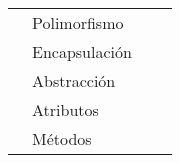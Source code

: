 \begin{table}[]
\begin{tabular}{|llll|}
                                                                            & Polimorfismo  &                                                                                                                                                                                                       &                                                                                                                                                                                                                                                             \\
                                                                            & Encapsulación &                                                                                                                                                                                                       &                                                                                                                                                                                                                                                             \\
                                                                            & Abstracción   &                                                                                                                                                                                                       &                                                                                                                                                                                                                                                             \\
                                                                            & Atributos     &                                                                                                                                                                                                       &                                                                                                                                                                                                                                                             \\
                                                                            & Métodos       &                                                                                                                                                                                                       &                                                                                                                                                                                                                                                             \\

\end{tabular}
\end{table}
